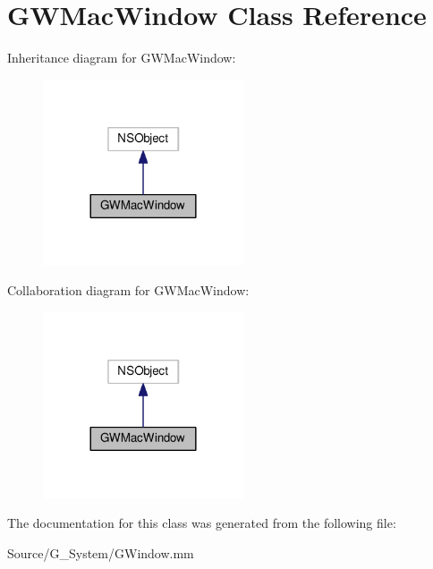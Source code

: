 \hypertarget{interfaceGWMacWindow}{}\section{G\+W\+Mac\+Window Class Reference}
\label{interfaceGWMacWindow}


Inheritance diagram for G\+W\+Mac\+Window\+:
\nopagebreak
\begin{figure}[H]
\begin{center}
\leavevmode
\includegraphics[width=168pt]{interfaceGWMacWindow__inherit__graph}
\end{center}
\end{figure}


Collaboration diagram for G\+W\+Mac\+Window\+:
\nopagebreak
\begin{figure}[H]
\begin{center}
\leavevmode
\includegraphics[width=168pt]{interfaceGWMacWindow__coll__graph}
\end{center}
\end{figure}


The documentation for this class was generated from the following file\+:\begin{DoxyCompactItemize}
\item 
Source/\+G\+\_\+\+System/G\+Window.\+mm\end{DoxyCompactItemize}

